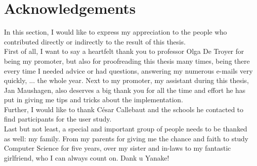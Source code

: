 \section*{Acknowledgements}\label{sec:acknowledgements}

\color{blue}
In this section, I would like to express my appreciation to the people who contributed directly or indirectly to the result of this thesis.\\

First of all, I want to say a heartfelt thank you to professor Olga De Troyer for being my promoter, but also for proofreading this thesis many times, being there every time I needed advice or had questions, answering my numerous e-mails very quickly, ... the whole year. Next to my promoter, my assistant during this thesis, Jan Maushagen, also deserves a big thank you for all the time and effort he has put in giving me tips and tricks about the implementation.\\

Further, I would like to thank C\'esar Callebaut and the schools he contacted to find participants for the user study.\\

Last but not least, a special and important group of people needs to be thanked as well: my family. From my parents for giving me the chance and faith to study Computer Science for five years, over my sister and in-laws to my fantastic girlfriend, who I can always count on. Dank u Yanake!

\color{black}